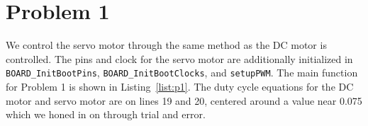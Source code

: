 \section*{Problem 1}
We control the servo motor through the same method as the DC motor is controlled. The pins and clock for the servo motor are additionally initialized in \texttt{BOARD\_InitBootPins}, \texttt{BOARD\_InitBootClocks}, and \texttt{setupPWM}. The main function for Problem 1 is shown in Listing~\ref{list:p1}. The duty cycle equations for the DC motor and servo motor are on lines 19 and 20, centered around a value near 0.075 which we honed in on through trial and error.
